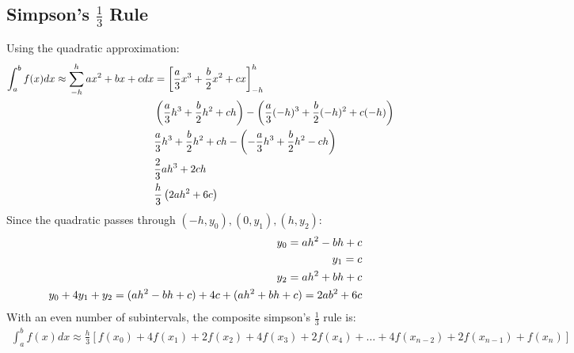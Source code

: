 	\subsection{Simpson's $\frac{1}{3}$ Rule}
		Using the quadratic approximation:
		\begin{align}
			\int_{a}^{b} f(x) dx \approx \sum_{-h}^{h} ax^{2}+bx+c dx &= \left[ \frac{a}{3}x^{3}+\frac{b}{2}x^{2}+cx\right]_{-h}^{h}& \notag \\
			&\left( \frac{a}{3}h^{3}+\frac{b}{2}h^{2}+ch\right) - \left( \frac{a}{3}(-h)^{3}+\frac{b}{2}(-h)^{2}+c(-h)\right)& \notag \\
			&\frac{a}{3}h^{3}+\frac{b}{2}h^{2}+ch - \left( -\frac{a}{3}h^{3}+\frac{b}{2}h^{2}-ch\right)& \notag \\
			&\frac{2}{3}ah^{3}+2ch& \notag \\
			&\frac{h}{3}\left(2ah^{2}+6c\right)&
		\end{align}
		Since the quadratic passes through $(-h,y_{0}),(0,y_{1}),(h,y_{2})$:
		\begin{align}
			y_{0} = ah^{2} - bh + c \notag \\
			y_{1} = c \notag \\
			y_{2} = ah^{2} + bh + c \notag \\
			y_{0} + 4y_{1} + y_{2} = (ah^{2}-bh+c) + 4c + (ah^{2}+bh+c) = 2ab^{2}+6c
		\end{align}
		With an even number of subintervals, the composite simpson's $\frac{1}{3}$ rule is:
		\begin{align}
			\int_{a}^{b} f(x) dx \approx \frac{h}{3}\left[f(x_{0})+4f(x_{1})+2f(x_{2})+4f(x_{3})+2f(x_{4})+\dots+4f(x_{n-2})+2f(x_{n-1})+f(x_{n})\right]
		\end{align}
